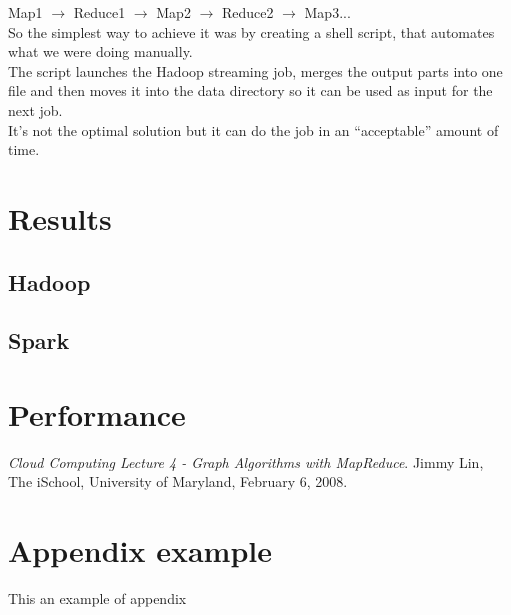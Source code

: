 \documentclass[english]{article}
\begin{document}
Map1 $\rightarrow$ Reduce1 $\rightarrow$ Map2 $\rightarrow$ Reduce2 $\rightarrow$ Map3... \\

So the simplest way to achieve it was by creating a shell script, that automates what we were doing manually.\\

The script launches the Hadoop streaming job, merges the output parts into one file and then moves it into the data directory so it can be used as input for the next job.\\

It’s not the optimal solution but it can do the job in an “acceptable” amount of time.\\

\section{Results}

\subsection{Hadoop}

\subsection{Spark}

\section{Performance}

\newpage

\begin{thebibliography}{9}
 \textit{Cloud Computing Lecture 4 - Graph Algorithms with MapReduce}. Jimmy Lin, The iSchool, University of Maryland, February 6, 2008.
\end{thebibliography}
\newpage
\appendix
\section{Appendix example}
This an example of appendix
\end{document}
